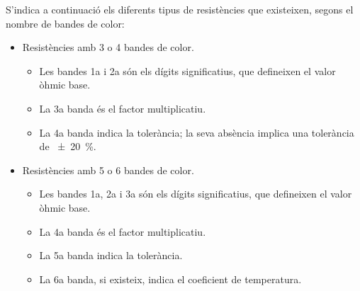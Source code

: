 S'indica a continuació els diferents tipus de resistències que existeixen, segons el nombre de bandes de color:
\begin{itemize}
    \item Resistències amb 3 o 4 bandes de color.
        \begin{itemize}
            \item Les bandes 1a i 2a són els dígits significatius, que defineixen el valor òhmic base.
            \item La 3a banda és el factor multiplicatiu.
            \item La 4a banda indica la tolerància;  la seva absència implica una tolerància de \qty{\pm 20}{\percent}.
        \end{itemize}
    \item Resistències amb 5 o 6 bandes de color.
        \begin{itemize}
            \item Les bandes 1a, 2a i 3a són els dígits significatius, que defineixen el valor òhmic base.
            \item La 4a banda és el factor multiplicatiu.
            \item La 5a banda indica la tolerància.
            \item La 6a banda, si existeix, indica el coeficient de temperatura.
        \end{itemize}
\end{itemize}



